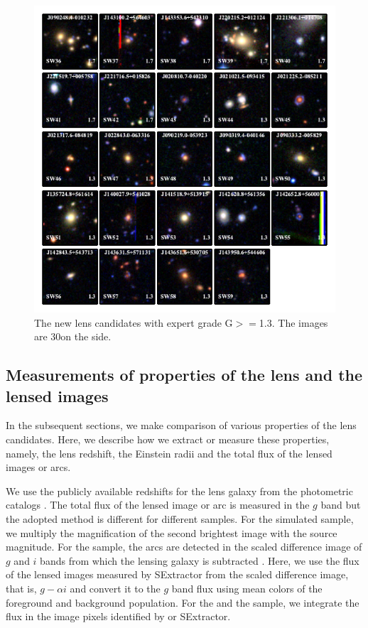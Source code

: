 \documentclass[useAMS,usenatbib,a4paper]{mn2e}
\begin{document}
\begin{figure}
\begin{center}
\includegraphics[scale=1.9]{lenscandfin_1.pdf}
\caption{ \label{fig:lc}
The new \sw lens candidates with expert grade G$>=$1.3. The images are
30\arcsec on the side.
}
\end{center}
\end{figure}


\subsection{Measurements of properties of the lens and the lensed images}
\label{sec:results:meas}

In the subsequent sections, we make comparison of various properties of the lens
candidates. Here, we describe how we extract or measure these properties, namely,
the lens redshift, the Einstein radii and the total flux of the lensed images or
arcs.

We use the publicly available redshifts for the lens galaxy from the
\cfhtls photometric catalogs \citep{Coupon2009}. The total flux of the
lensed image or arc is measured in the $g$ band but the adopted method
is different for different samples. For the simulated sample, we
multiply the magnification of the second brightest image with the source
magnitude. For the \rf sample, the arcs are detected in the scaled
difference image of $g$ and $i$ bands from which the lensing galaxy is
subtracted \citep[for details, see][]{Gavazzi2014}. Here, we use the flux
of the lensed images measured by {\sc SExtractor} from the scaled
difference image, that is, $g-\alpha i$ and convert it to the $g$ band
flux using mean colors of the foreground and background population. For
the \af and the \sw sample, we integrate the flux in the image pixels
identified by \af or {\sc SExtractor}.
\end{document}
